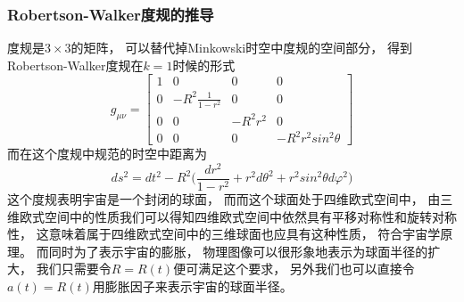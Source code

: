 \documentclass[8pt]{beamer}
\begin{document}
        \begin{frame}[fragile]
            \frametitle{Robertson-Walker度规的推导}
            \begin{multicols}{2} 
                \qquad
                度规是$3\times 3$的矩阵，
                可以替代掉Minkowski时空中度规的空间部分，
                得到Robertson-Walker度规在$k=1$时候的形式
                $$g_{\mu \nu}=
                \begin{bmatrix}
                    1  &             0         &   0       &  0   \\
                    0   &   -R^2\frac{1}{1-r^2}  &   0       &  0   \\
                    0   &   0                   &   -R^2r^2  &  0   \\
                    0   &   0                   &   0       &  -R^2r^2sin^2\theta
                \end{bmatrix}
                $$
                而在这个度规中规范的时空中距离为
                $$ds^2=dt^2-R^2\biggl(\frac{dr^2}{1-r^2}+r^2d\theta^2+r^2sin^2\theta d\varphi^2\biggr)$$
                这个度规表明宇宙是一个封闭的球面，
                而而这个球面处于四维欧式空间中，
                由三维欧式空间中的性质我们可以得知四维欧式空间中依然具有平移对称性和旋转对称性，
                这意味着属于四维欧式空间中的三维球面也应具有这种性质，
                符合宇宙学原理。
                而同时为了表示宇宙的膨胀，
                物理图像可以很形象地表示为球面半径的扩大，
                我们只需要令$R=R(t)$便可满足这个要求，
                另外我们也可以直接令$a(t)=R(t)$用膨胀因子来表示宇宙的球面半径。
            \end{multicols}
        \end{frame}
\end{document}
